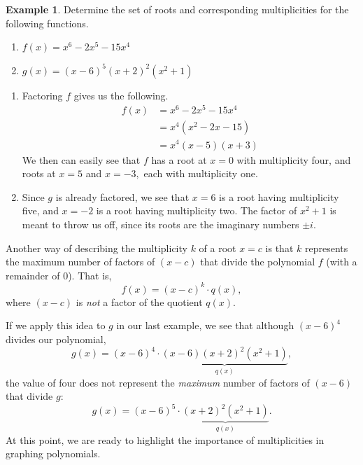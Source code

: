 \documentclass[12pt]{book}
\theoremstyle{definition}
\newtheorem{example}{Example}
\begin{document}
\begin{example}
Determine the set of roots and corresponding multiplicities for the following functions.
\begin{multicols}{2}
\begin{enumerate}
	\item $f(x)=x^6-2x^5-15x^4$
	\item $g(x)=(x-6)^5(x+2)^2(x^2+1)$
\end{enumerate}
\end{multicols}
\begin{enumerate}
	\item Factoring $f$ gives us the following.
	\begin{equation*}
	\begin{split}
		f(x)&=x^6-2x^5-15x^4\\
		&=x^4(x^2-2x-15)\\
		&=x^4(x-5)(x+3)
	\end{split}
	\end{equation*}
We then can easily see that $f$ has a root at $x=0$ with multiplicity four, and roots at $x=5$ and $x=-3,$ each with multiplicity one.
\item Since $g$ is already factored, we see that $x=6$ is a root having multiplicity five, and $x=-2$ is a root having multiplicity two.  The factor of $x^2+1$ is meant to throw us off, since its roots are the imaginary numbers $\pm i$.
\end{enumerate}
\end{example}
Another way of describing the multiplicity $k$ of a root $x=c$ is that $k$ represents the maximum number of factors of $(x-c)$ that divide the polynomial $f$ (with a remainder of $0$).  That is,
$$f(x)=(x-c)^k\cdot q(x),$$
where $(x-c)$ is {\it not} a factor of the quotient $q(x)$.
\par
If we apply this idea to $g$ in our last example, we see that although $(x-6)^4$ divides our polynomial,
$$g(x)=(x-6)^4\cdot \underbrace{(x-6)(x+2)^2(x^2+1)}_{q(x)},$$
the value of four does not represent the {\it maximum} number of factors of $(x-6)$ that divide $g$: 
$$g(x)=(x-6)^5\cdot \underbrace{(x+2)^2(x^2+1)}_{q(x)}.$$
At this point, we are ready to highlight the importance of multiplicities in graphing polynomials.
\begin{center}
\end{center}
\end{document}
